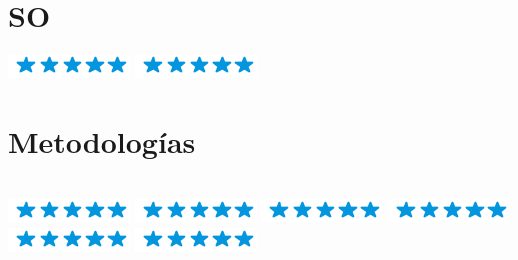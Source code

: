 \documentclass[]{cv-class}
\begin{document}
\begin{aside}
	\section{SO}
	{\includegraphics[scale=0.40]{img/5stars.png}}
	{\includegraphics[scale=0.40]{img/5stars.png}}
	~
	\section{Metodologías} \\
	{\includegraphics[scale=0.40]{img/5stars.png}}
	{\includegraphics[scale=0.40]{img/5stars.png}}
	{\includegraphics[scale=0.40]{img/5stars.png}}
	{\includegraphics[scale=0.40]{img/5stars.png}}
	{\includegraphics[scale=0.40]{img/5stars.png}}
	{\includegraphics[scale=0.40]{img/5stars.png}}
	    
	~

\end{aside}
\end{document}
